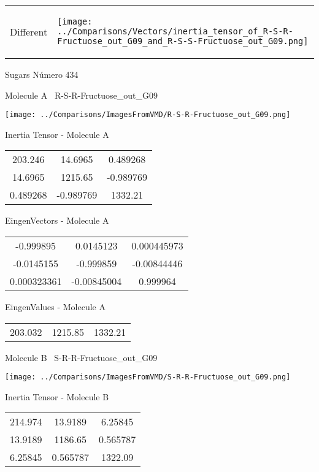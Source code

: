 \vtab[-5mm]
\begin{tabular}{*{2}{m{}}}
\begin{center}
\textcolor{NavyBlue}{\Large Different}
\end{center}
&
\begin{center}
\texttt{[image: ../Comparisons/Vectors/inertia\_tensor\_of\_R-S-R-Fructuose\_out\_G09\_and\_R-S-S-Fructuose\_out\_G09.png]}
\end{center}
\end{tabular}

 \newpage

\vtab[-3cm]
\begin{center}
{\large Sugars \tab Número 434}
\end{center}
\begin{multicols}{2}
\begin{center}

Molecule A \
R-S-R-Fructuose\_out\_G09

\texttt{[image: ../Comparisons/ImagesFromVMD/R-S-R-Fructuose\_out\_G09.png]}

Inertia Tensor - Molecule A \\
\begin{tabular}{|c c c|}
203.246	 & 	14.6965	 & 	0.489268	 \\
14.6965	 & 	1215.65	 & 	-0.989769	 \\
0.489268	 & 	-0.989769	 & 	1332.21
\end{tabular}

\vtab
 EingenVectors - Molecule A     \\
\begin{tabular}{|c c c|}
-0.999895	 & 	0.0145123	 & 	0.000445973	 \\
-0.0145155	 & 	-0.999859	 & 	-0.00844446	 \\
0.000323361	 & 	-0.00845004	 & 	0.999964
\end{tabular}

\vtab
 EingenValues - Molecule A     \\
\begin{tabular}{|c c c|}
203.032	 & 	1215.85	 & 	1332.21	 \\
\end{tabular}
\columnbreak

Molecule B \
S-R-R-Fructuose\_out\_G09

\texttt{[image: ../Comparisons/ImagesFromVMD/S-R-R-Fructuose\_out\_G09.png]}

Inertia Tensor - Molecule B \\
\begin{tabular}{|c c c|}
214.974	 & 	13.9189	 & 	6.25845	 \\
13.9189	 & 	1186.65	 & 	0.565787	 \\
6.25845	 & 	0.565787	 & 	1322.09
\end{tabular}


\end{center}
\end{multicols}
